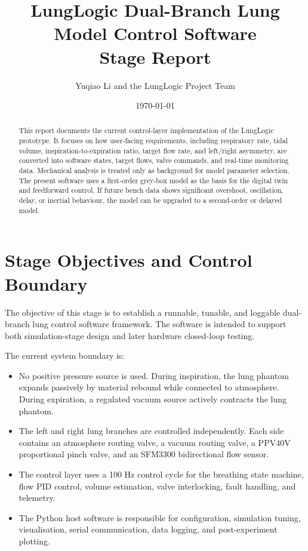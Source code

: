 \documentclass[11pt,a4paper]{article}
\title{
  \bfseries\color{titleblue}
  LungLogic Dual-Branch Lung Model Control Software\\Stage Report
}
\author{Yuqiao Li and the LungLogic Project Team}
\date{\today}
\begin{document}
\maketitle

\begin{abstract}
This report documents the current control-layer implementation of the LungLogic prototype. It focuses on how user-facing requirements, including respiratory rate, tidal volume, inspiration-to-expiration ratio, target flow rate, and left/right asymmetry, are converted into software states, target flows, valve commands, and real-time monitoring data. Mechanical analysis is treated only as background for model parameter selection. The present software uses a first-order grey-box model as the basis for the digital twin and feedforward control. If future bench data shows significant overshoot, oscillation, delay, or inertial behaviour, the model can be upgraded to a second-order or delayed model.
\end{abstract}

\tableofcontents
\newpage

\section{Stage Objectives and Control Boundary}

The objective of this stage is to establish a runnable, tunable, and loggable dual-branch lung control software framework. The software is intended to support both simulation-stage design and later hardware closed-loop testing.

The current system boundary is:

\begin{itemize}
  \item No positive pressure source is used. During inspiration, the lung phantom expands passively by material rebound while connected to atmosphere. During expiration, a regulated vacuum source actively contracts the lung phantom.
  \item The left and right lung branches are controlled independently. Each side contains an atmosphere routing valve, a vacuum routing valve, a PPV40V proportional pinch valve, and an SFM3300 bidirectional flow sensor.
  \item The control layer uses a 100 Hz control cycle for the breathing state machine, flow PID control, volume estimation, valve interlocking, fault handling, and telemetry.
  \item The Python host software is responsible for configuration, simulation tuning, visualisation, serial communication, data logging, and post-experiment plotting.
\end{itemize}
\end{document}

